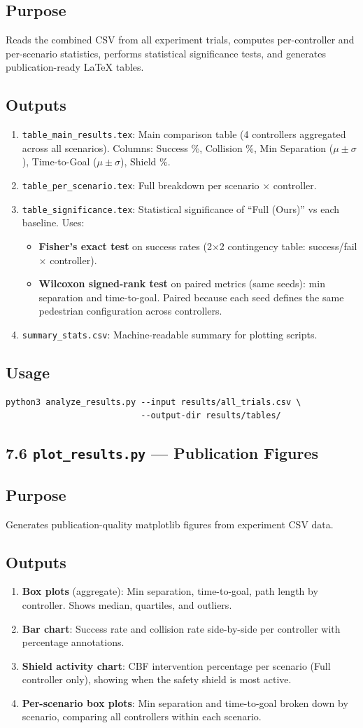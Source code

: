 \documentclass[11pt]{article}
\newcommand{\logentry}[1]{\subsection*{#1}}
\begin{document}
\logentry{Purpose}
Reads the combined CSV from all experiment trials, computes per-controller and
per-scenario statistics, performs statistical significance tests, and generates
publication-ready LaTeX tables.

\logentry{Outputs}
\begin{enumerate}
  \item \texttt{table\_main\_results.tex}: Main comparison table (4 controllers
    aggregated across all scenarios). Columns: Success \%, Collision \%, Min
    Separation ($\mu \pm \sigma$), Time-to-Goal ($\mu \pm \sigma$), Shield \%.
  \item \texttt{table\_per\_scenario.tex}: Full breakdown per scenario $\times$
    controller.
  \item \texttt{table\_significance.tex}: Statistical significance of ``Full
    (Ours)'' vs each baseline. Uses:
    \begin{itemize}
      \item \textbf{Fisher's exact test} on success rates (2$\times$2 contingency
        table: success/fail $\times$ controller).
      \item \textbf{Wilcoxon signed-rank test} on paired metrics (same seeds):
        min separation and time-to-goal. Paired because each seed defines the
        same pedestrian configuration across controllers.
    \end{itemize}
  \item \texttt{summary\_stats.csv}: Machine-readable summary for plotting scripts.
\end{enumerate}

\logentry{Usage}
\begin{verbatim}
python3 analyze_results.py --input results/all_trials.csv \
                           --output-dir results/tables/
\end{verbatim}


\subsection*{7.6 \texttt{plot\_results.py} --- Publication Figures}

\logentry{Purpose}
Generates publication-quality matplotlib figures from experiment CSV data.

\logentry{Outputs}
\begin{enumerate}
  \item \textbf{Box plots} (aggregate): Min separation, time-to-goal, path length
    by controller. Shows median, quartiles, and outliers.
  \item \textbf{Bar chart}: Success rate and collision rate side-by-side per
    controller with percentage annotations.
  \item \textbf{Shield activity chart}: CBF intervention percentage per scenario
    (Full controller only), showing when the safety shield is most active.
  \item \textbf{Per-scenario box plots}: Min separation and time-to-goal broken
    down by scenario, comparing all controllers within each scenario.
\end{enumerate}
\end{document}
